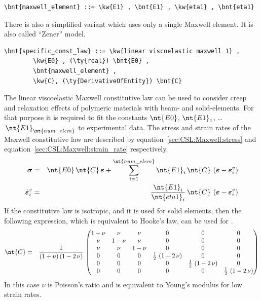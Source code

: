 \begin{Verbatim}[commandchars=\\\{\}]
    \bnt{maxwell_element} ::= \kw{E1} , \bnt{E1} , \kw{eta1} , \bnt{eta1}
\end{Verbatim}
There is also a simplified variant which uses only a single Maxwell element. It is also called ``Zener'' model.
\begin{Verbatim}[commandchars=\\\{\}]
    \bnt{specific_const_law} ::= \kw{linear viscoelastic maxwell 1} ,
        \kw{E0} , (\ty{real}) \bnt{E0} ,
        \bnt{maxwell_element} ,
        \kw{C}, (\ty{DerivativeOfEntity}) \bnt{C}
\end{Verbatim}
The linear viscoelastic Maxwell constitutive law can be used to consider creep and relaxation effects of polymeric materials with beam- and solid-elements.
For that purpose it is required to fit the constants $\nt{E0}$, $\nt{E1}_1$, \ldots $\,\nt{E1}_{\nt{num\_elem}}$ to experimental data.
The stress and strain rates of the Maxwell constitutive law are described by equation~\ref{sec:CSL:Maxwell:stress} and equation~\ref{sec:CSL:Maxwell:strain_rate} respectively.
\begin{eqnarray}
  \boldsymbol{\sigma} &=& \nt{E0} \, \nt{C} \, \boldsymbol{\varepsilon} + \sum_{i=1}^{\nt{num\_elem}} \nt{E1}_i \, \nt{C} \, \left(\boldsymbol{\varepsilon} - \boldsymbol{\varepsilon}_i^v\right) \label{sec:CSL:Maxwell:stress} \\
  \dot{\boldsymbol{\varepsilon}}_i^v &=& \frac{\nt{E1}_i}{\nt{eta1}_i} \, \nt{C} \, \left(\boldsymbol{\varepsilon} - \boldsymbol{\varepsilon}_i^v\right) \label{sec:CSL:Maxwell:strain_rate}
\end{eqnarray}
If the constitutive law is isotropic, and it is used for solid elements, then the following expression, which is equivalent to Hooke's law, can be used for .
\begin{eqnarray}
  \nt{C} &=& \frac{1}{\left(1 + \nu\right)\left(1 - 2 \, \nu\right)} \, \begin{pmatrix}
    1 - \nu & \nu & \nu & 0 & 0 & 0 \\
    \nu & 1 - \nu & \nu & 0 & 0 & 0 \\
    \nu & \nu & 1 - \nu & 0 & 0 & 0 \\
    0 & 0 & 0 & \frac{1}{2} \, \left(1 - 2 \, \nu\right) & 0 & 0 \\
    0 & 0 & 0 & 0 & \frac{1}{2} \, \left(1 - 2 \, \nu\right) & 0 \\
    0 & 0 & 0 & 0 & 0 & \frac{1}{2} \, \left(1 - 2 \, \nu\right)
  \end{pmatrix}
\end{eqnarray}
In this case $\nu$ is Poisson's ratio and  is equivalent to Young's modulus for low strain rates.
